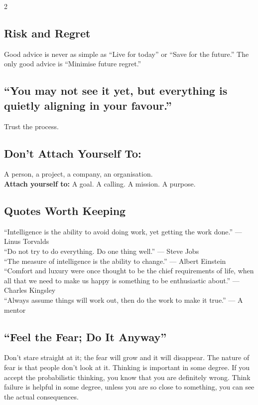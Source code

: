 \documentclass[10pt,a4paper]{article}
\begin{document}
\begin{multicols}{2}
\subsection{Risk and Regret}
\begin{keybox}
Good advice is never as simple as ``Live for today'' or ``Save for the future.'' The only good advice is ``Minimise future regret.''
\end{keybox}

\subsection{``You may not see it yet, but everything is quietly aligning in your favour.''}
Trust the process.

\subsection{Don't Attach Yourself To:}
A person, a project, a company, an organisation.\\
\textbf{Attach yourself to:} A goal. A calling. A mission. A purpose.

\subsection{Quotes Worth Keeping}
``Intelligence is the ability to avoid doing work, yet getting the work done.'' --- Linus Torvalds\\
``Do not try to do everything. Do one thing well.'' --- Steve Jobs\\
``The measure of intelligence is the ability to change.'' --- Albert Einstein\\
``Comfort and luxury were once thought to be the chief requirements of life, when all that we need to make us happy is something to be enthusiastic about.'' --- Charles Kingsley\\
``Always assume things will work out, then do the work to make it true.'' --- A mentor

\subsection{``Feel the Fear; Do It Anyway''}
Don't stare straight at it; the fear will grow and it will disappear. The nature of fear is that people don't look at it. Thinking is important in some degree. If you accept the probabilistic thinking, you know that you are definitely wrong. Think failure is helpful in some degree, unless you are so close to something, you can see the actual consequences.


\end{multicols}
\end{document}
